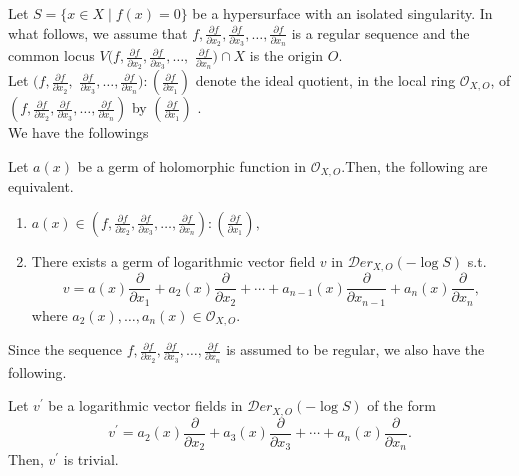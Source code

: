 \documentclass[pdftex]{arxsigma}
\begin{document}
Let $ S =\{ x \in X \mid f(x) =0 \} $ be a hypersurface with an isolated singularity. In what follows, 
we assume that $ f, \frac{\partial f}{\partial x_2}, \frac{\partial f}{\partial x_3},\ldots,\frac{\partial f}{\partial x_{n}} $ 
is a regular sequence and the common locus 
 $V(f, \frac{\partial f}{\partial x_2}, \frac{\partial f}{\partial x_3},\ldots,$ $\frac{\partial f}{\partial x_{n}})\cap X$
is the origin $ O $.\\

Let $ (f, \frac{\partial f}{\partial x_2},$ $\frac{\partial f}{\partial x_3},\ldots,\frac{\partial f}{\partial x_{n}}) : (\frac{\partial f}{\partial x_1}) $ denote the ideal quotient, in the local ring $ {\mathcal O}_{X,O} $,  of
$(f, \frac{\partial f}{\partial x_2}, \frac{\partial f}{\partial x_3},\ldots,
\frac{\partial f}{\partial x_{n}}) $ by $ (\frac{\partial f}{\partial x_1}) $
.\\

We have the followings

\begin{lemma}
Let $ a(x) $ be a germ of holomorphic function in $  {\mathcal O}_{X,O}. $Then, the following are equivalent.
\begin{enumerate}
\item[(i)\ ] $ a(x) \in (f, \frac{\partial f}{\partial x_2}, \frac{\partial f}{\partial x_3},\ldots,\frac{\partial f}{\partial x_{n}}) : (\frac{\partial f}{\partial x_1}),$ 

\item[(ii)] There exists a germ of logarithmic vector field $ v $ in $  {\mathcal Der}_{X, O}(-\log S) $ s.t.
\begin{equation*}
v= a(x)\frac{\partial }{\partial x_1} + a_2(x)\frac{\partial}{\partial x_2} + \cdots + a_{n-1}(x)\frac{\partial}{\partial x_{n-1}}+ a_n(x)\frac{\partial}{\partial x_n}, 
\end{equation*}
where $  a_2(x), \ldots , a_{n}(x) \in {\mathcal O}_{X, O}. $
\end{enumerate}
\end{lemma}


Since the sequence   $ f, \frac{\partial f}{\partial x_2}, \frac{\partial f}{\partial x_3},\ldots,\frac{\partial f}{\partial x_{n}} $ is assumed to be  regular, we also have the following. 

\begin{lemma}
Let $ v^{\prime} $ be a logarithmic vector fields in  $  {\mathcal Der}_{X, O}(-\log S) $ of the form
\begin{equation*}
v^{\prime}= a_2(x)\frac{\partial }{\partial x_2} + a_3(x)\frac{\partial}{\partial x_3} + \cdots +a_{n}(x)\frac{\partial}{\partial x_{n}}. 
\end{equation*}
Then, $ v^{\prime} $ is trivial.
\end{lemma}
\end{document}
